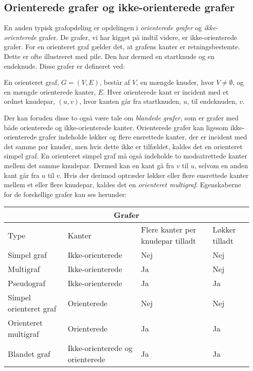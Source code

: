 \subsection{Orienterede grafer og ikke-orienterede grafer}
En anden typisk grafopdeling er opdelingen i \emph{orienterede grafer} og \emph{ikke-orienterede} grafer. De grafer, vi har kigget på indtil videre, er ikke-orienterede grafer. For en orienteret graf gælder det, at grafens kanter er retningsbestemte. Dette er ofte illustreret med pile. Den har dermed en startknude og en endeknude. Disse grafer er defineret ved:

\begin{defn}  
En orienteret graf, $G=(V,E)$, består af $V$, en mængde knuder, hvor $V \neq \emptyset$, og en mængde orienterede kanter, $E$. Hver orienterede kant er incident med et ordnet knudepar, $(u,v)$, hvor kanten går fra startknuden, $u$, til endeknuden, $v$. 
\end{defn}



Der kan foruden disse to også være tale om \emph{blandede grafer}, som er grafer med både orienterede og ikke-orienterede kanter. Orienterede grafer kan ligesom ikke-orienterede grafer indeholde løkker og flere ensrettede kanter, der er incident med det samme par knuder, men hvis dette ikke er tilfældet, kaldes det en orienteret simpel graf. En orienteret simpel graf må også indeholde to modsatrettede kanter mellem det samme knudepar. Dermed kan en kant gå fra $v$ til $u$, selvom en anden kant går fra $u$ til $v$. Hvis der derimod optræder løkker eller flere ensrettede kanter mellem et eller flere knudepar, kaldes det en \emph{orienteret multigraf}.  
Egenskaberne for de forskellige grafer kan ses herunder:


\begin{center} \label{tab:typer}
\begin{tabular}{ |p{4cm}|p{3cm}|p{3cm}|p{2cm}|  }
 \hline
 \multicolumn{4}{|c|}{Grafer} \\
 \hline
 Type & Kanter & Flere kanter per knudepar tilladt & Løkker tilladt\\
 \hline
 Simpel graf   & Ikke-orienterede    & Nej &   Nej\\
 Multigraf &   Ikke-orienterede & Ja   & Nej\\
 Pseudograf & Ikke-orienterede & Ja &  Ja\\
 Simpel orienteret graf    & Orienterede & Nej &  Nej\\
 Orienteret multigraf &  Orienterede  & Ja & Ja\\
 Blandet graf & Ikke-orienterede og orienterede  & Ja   & Ja\\
 \hline
\end{tabular}
\end{center}

